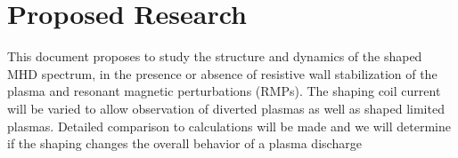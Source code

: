 \documentclass[aps,prl,twocolumn,superscriptaddress,groupedaddress]{revtex4}  %
\begin{document}

\section{Proposed Research}
	This document proposes to study the structure and dynamics of the shaped MHD spectrum, in the presence or absence of resistive wall  stabilization of the plasma and resonant magnetic perturbations (RMPs).  The shaping coil current will be varied to allow observation of diverted plasmas as well as shaped limited plasmas.  Detailed comparison to calculations will be made and we will determine if the shaping changes the overall behavior of a plasma discharge\par 
\end{document}
